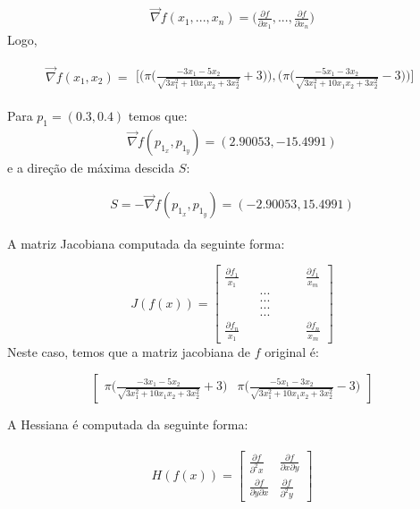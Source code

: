 \documentclass[fleqn, 11pt]{article}
\begin{document}
\begin{align*}
\vec{\nabla} f(x_1, ..., x_n) = \biggl( \frac{\partial f}{\partial x_1}, ..., \frac{\partial f}{\partial x_n} \biggr) \end{align*}
Logo, 

\begin{align*}
\vec{\nabla} f(x_1, x_2) = 
\begin{split}
\biggr [\biggr ( \pi \biggr (\frac{-3x_1-5x_2}{\sqrt{3x_{{1}}^2+10x_{1}x_{2}+3x_2^2}} + 3 \biggl ) \biggl ), 
\biggr ( \pi \biggr (\frac{-5x_1-3x_2}{\sqrt{3x_{{1}}^2+10x_{1}x_{2}+3x_2^2}} - 3
\biggl )
\biggl )
 \biggl ]
\end{split}
\end{align*}

Para $p_1 = (0.3, 0.4)$ temos que:
\begin{align*}
\vec{\nabla} f(p_{{1}_{x}}, p_{{1}_{y}}) = (2.90053, -15.4991)
\end{align*}
e a direção de máxima descida $S$: 

\begin{align*}
S = -\vec{\nabla} f(p_{{1}_{x}}, p_{{1}_{y}}) = (-2.90053, 15.4991)
\end{align*}

A matriz Jacobiana computada da seguinte forma:

$$
J(f(x)) = 
  \begin{bmatrix}
  \frac{\partial f_1}{x_1} &  &  & &  &  \frac{\partial f_1}{x_m} \\
   & & ...  & & & \\
   & & ...  & & & \\
   & & ...  & & & \\
   & & ...  & & & \\
 \frac{\partial f_n}{x_1} &   & \phantom{-2}  &  &   &  \frac{\partial f_n}{x_m}
  \end{bmatrix}
$$
Neste caso, temos que a matriz jacobiana de $f$ original é:

$$
\begin{bmatrix}
 \pi \biggr (\frac{-3x_1-5x_2}{\sqrt{3x_{{1}}^2+10x_{1}x_{2}+3x_2^2}} + 3 \biggl )
 & 
 \pi \biggr (\frac{-5x_1-3x_2}{\sqrt{3x_{{1}}^2+10x_{1}x_{2}+3x_2^2}} - 3
\biggl )
\end{bmatrix}
$$

A Hessiana é computada da seguinte forma:

\begin{align*}
\begin{split}
H(f(x)) =
\begin{bmatrix}
\frac{\partial f}{\partial^{2} x} & \frac{\partial f}{\partial x \partial y} \\ 
\frac{\partial f}{\partial y \partial x} & \frac{\partial f}{\partial^{2} y}
\end{bmatrix}
\end{split}
\end{align*}
\end{document}
